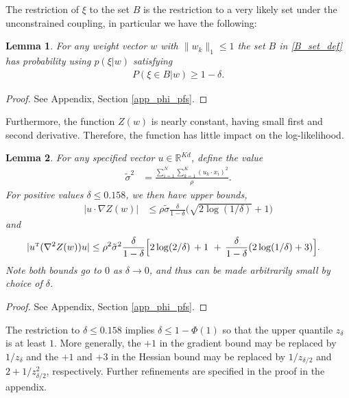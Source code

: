 \documentclass{article}
\numberwithin{equation}{section}
\theoremstyle{Lemma}
\newtheorem{lemma}{Lemma}
\theoremstyle{Corollary}
\theoremstyle{Theorem}
\theoremstyle{Remark}
\begin{document}
The restriction of $\xi$ to the set $B$ is the restriction to a very likely set under the unconstrained coupling, in particular we have the following:
\begin{lemma}\label{unconstrained_prob}
    For any weight vector $w$ with $\|w_{k}\|_{1} \leq 1$ the set $B$ in \eqref{B_set_def} has probability using $p(\xi|w)$ satisfying
    \begin{align}
    P(\xi \in B|w) \geq 1-\delta.
    \end{align}
\end{lemma}
\begin{proof}
    See Appendix, Section \ref{app_phi_pfs}.
\end{proof}
Furthermore, the function $Z(w)$ is nearly constant, having small first and second derivative. Therefore, the function has little impact on the log-likelihood.
\begin{lemma}\label{small_derivatives}
For any specified vector $u \in \mathbb{R}^{Kd}$, define the value
\begin{align}
    \tilde{\sigma}^{2}&= \frac{\sum_{i=1}^{N}\sum_{k=1}^{K}(u_{k}\cdot x_{i})^{2}}{\rho}.
\end{align}
For positive values $\delta \leq 0.158$, we then have upper bounds,
    \begin{align}
    |u\cdot  \nabla  Z(w)|&\leq \rho \tilde{\sigma}\frac{\delta}{1-\delta}\big(\sqrt{2\log(1/\delta)}+1\big)
    \end{align}
    and
    \begin{align}
    |u^{\text{\tiny{T}}}(\nabla^2 Z(w))u|&\leq \rho^2\tilde{\sigma}^2\frac{\delta}{1-\delta}\Big[2\log(2/\delta)\,+1\,\,+\,\frac{\delta}{1-\delta} (2\log(1/\delta)+3) \Big].
\end{align}
Note both bounds go to $0$ as $\delta \to 0$, and thus can be made arbitrarily small by choice of $\delta$.  
\end{lemma}

\begin{proof}
    See Appendix, Section \ref{app_phi_pfs}.
\end{proof}
The restriction to $\delta\le 0.158$ implies $\delta\le 1-\Phi(1)$ so that the upper quantile $z_\delta$ is at least $1$. More generally, the $+1$ in the gradient bound may be replaced by $1/z_\delta$ and the $+1$ and $+3$ in the Hessian bound may be replaced by $1/z_{\delta/2}$ and $2+1/z_{\delta/2}^2$, respectively. Further refinements are specified in the proof in the appendix. %
\end{document}
